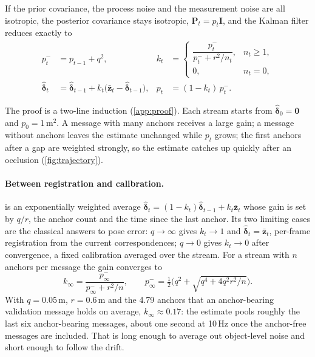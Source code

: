\begin{proposition}
\label{prop:scalar}
If the prior covariance, the process noise and the measurement noise are all isotropic, the posterior covariance stays isotropic, $\mathbf P_t=p_t\mathbf I$, and the Kalman filter reduces exactly to
\begin{align}
  p_t^-&=p_{t-1}+q^2, &
  k_t&=\begin{cases}\dfrac{p_t^-}{p_t^-+r^2/n_t}, & n_t\ge1,\\[1ex] 0, & n_t=0,\end{cases}\label{eq:gain}\\
  \hat{\boldsymbol\delta}_t&=\hat{\boldsymbol\delta}_{t-1}+k_t\big(\bar{\mathbf z}_t-\hat{\boldsymbol\delta}_{t-1}\big), &
  p_t&=(1-k_t)\,p_t^- .\label{eq:update}
\end{align}
\end{proposition}
The proof is a two-line induction (\cref{app:proof}).
Each stream starts from $\hat{\boldsymbol\delta}_0=\mathbf 0$ and $p_0=1$\,m$^2$.
A message with many anchors receives a large gain; a message without anchors leaves the estimate unchanged while $p_t$ grows; the first anchors after a gap are weighted strongly, so the estimate catches up quickly after an occlusion (\cref{fig:trajectory}).

\paragraph{Between registration and calibration.}
 is an exponentially weighted average $\hat{\boldsymbol\delta}_t=(1-k_t)\hat{\boldsymbol\delta}_{t-1}+k_t\bar{\mathbf z}_t$ whose gain is set by $q/r$, the anchor count and the time since the last anchor.
Its two limiting cases are the classical answers to pose error: $q\to\infty$ gives $k_t\to1$ and $\hat{\boldsymbol\delta}_t=\bar{\mathbf z}_t$, \ie per-frame registration from the current correspondences; $q\to0$ gives $k_t\to0$ after convergence, \ie a fixed calibration averaged over the stream.
For a stream with $n$ anchors per message the gain converges to
\begin{equation}
  k_\infty=\frac{p^-_\infty}{p^-_\infty+r^2/n},\qquad p^-_\infty=\tfrac12\Big(q^2+\sqrt{q^4+4q^2r^2/n}\Big).
  \label{eq:steady}
\end{equation}
With $q=0.05$\,m, $r=0.6$\,m and the 4.79 anchors that an anchor-bearing validation message holds on average, $k_\infty\approx0.17$: the estimate pools roughly the last six anchor-bearing messages, about one second at 10\,Hz once the anchor-free messages are included.
That is long enough to average out object-level noise and short enough to follow the drift.

